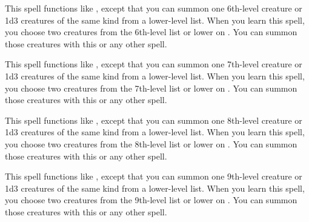 \spelldur{\durshort \dismissable}
\spellline
\spelleffect This spell functions like , except that you can summon one 6th-level creature or 1d3 creatures of the same kind from a lower-level list. When you learn this spell, you choose two creatures from the 6th-level list or lower on . You can summon those creatures with this or any other  spell.

\spelldur{\durshort \dismissable}
\spellline
\spelleffect This spell functions like , except that you can summon one 7th-level creature or 1d3 creatures of the same kind from a lower-level list. When you learn this spell, you choose two creatures from the 7th-level list or lower on . You can summon those creatures with this or any other  spell.

\spelldur{\durshort \dismissable}
\spellline
\spelleffect This spell functions like , except that you can summon one 8th-level creature or 1d3 creatures of the same kind from a lower-level list. When you learn this spell, you choose two creatures from the 8th-level list or lower on . You can summon those creatures with this or any other  spell.

\spelldur{\durshort \dismissable}
\spellline
\spelleffect This spell functions like , except that you can summon one 9th-level creature or 1d3 creatures of the same kind from a lower-level list. When you learn this spell, you choose two creatures from the 9th-level list or lower on . You can summon those creatures with this or any other  spell.

